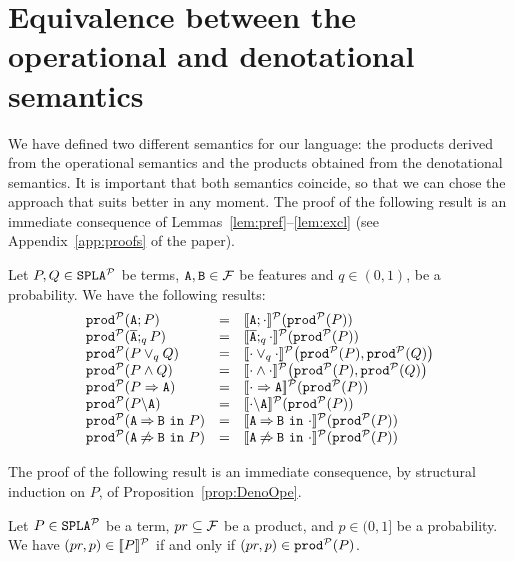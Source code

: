 \section{Equivalence between the operational and denotational semantics}\label{sec:equivalenceMain}
We have defined two different semantics for our language:
the products derived from the operational semantics and the products
obtained from the denotational semantics. It is important that
both semantics coincide, so that we can chose the approach that suits
better in any moment. The proof of the following result is an immediate consequence of Lemmas~\ref{lem:pref}--\ref{lem:excl} (see Appendix~\ref{app:proofs} of the paper).

\bprop\label{prop:DenoOpe}
  Let $P,Q\in\mathtt{SPLA{^{\cal P}}}$ be terms, $\mathtt{A},\mathtt{B}\in{\cal F}$ be features and $q\in (0,1)$, be a probability. We have the following results:
  $$\begin{array}{lll}
  \prodp(\feature{A};P)&=&\semdenp{\feature{A};\cdot}(\prodp(P))\\
  \prodp(\ofeature{A};_qP)&=&\semdenp{\ofeature{A};_q\cdot}(\prodp(P))\\
  \prodp(P\choice_q Q)&=&\semdenp{\cdot\choice_q\cdot}\bigl(\prodp(P),\prodp(Q)\bigr)\\
  \prodp(P\paral Q)&=&\semdenp{\cdot\paral\cdot}\bigl(\prodp(P),\prodp(Q)\bigr)\\
  \prodp(\mandatory{A}{P})&=&\semdenp{\mandatory{A}{\cdot}}(\prodp(P))\\
  \prodp(\forbid{A}{P})&=&\semdenp{\forbid{A}{\cdot}}(\prodp(P))\\
  \prodp(\require{A}{B}{P})&=&\semdenp{\require{A}{B}{\cdot}}(\prodp(P))\\
  \prodp(\exclude{A}{B}{P})&=&\semdenp{\exclude{A}{B}{\cdot}}(\prodp(P))
\end{array}$$
\eprop

The proof of the following result is an immediate consequence, by structural induction on $P$, of
Proposition~\ref{prop:DenoOpe}.


\bthm\label{prop:equivprob}
  Let $P\in\mathtt{SPLA{^{\cal P}}}$ be a term, $pr\subseteq{\cal F}$ be a product, and
  $p\in(0,1]$ be a probability. We have $ (pr,p)\in[\![P]\!]^{\cal P}$ if and only if
  $(pr,p)\in\mathtt{prod}^{\cal P}(P)$.
\ethm



